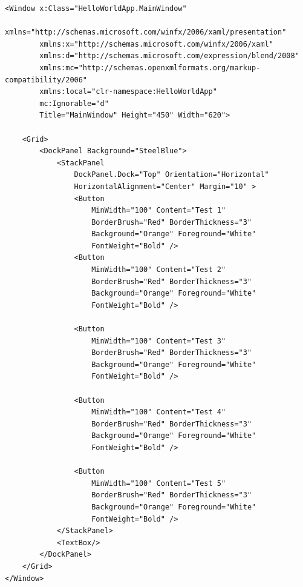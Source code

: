\newpage
\begin{verbatim}
<Window x:Class="HelloWorldApp.MainWindow"
        xmlns="http://schemas.microsoft.com/winfx/2006/xaml/presentation"
        xmlns:x="http://schemas.microsoft.com/winfx/2006/xaml"
        xmlns:d="http://schemas.microsoft.com/expression/blend/2008"
        xmlns:mc="http://schemas.openxmlformats.org/markup-compatibility/2006"
        xmlns:local="clr-namespace:HelloWorldApp"
        mc:Ignorable="d"
        Title="MainWindow" Height="450" Width="620">

    <Grid>
        <DockPanel Background="SteelBlue">
            <StackPanel 
                DockPanel.Dock="Top" Orientation="Horizontal" 
                HorizontalAlignment="Center" Margin="10" >
                <Button
                    MinWidth="100" Content="Test 1" 
                    BorderBrush="Red" BorderThickness="3"
                    Background="Orange" Foreground="White"
                    FontWeight="Bold" />
                <Button
                    MinWidth="100" Content="Test 2" 
                    BorderBrush="Red" BorderThickness="3"
                    Background="Orange" Foreground="White"
                    FontWeight="Bold" />
                    
                <Button 
                    MinWidth="100" Content="Test 3" 
                    BorderBrush="Red" BorderThickness="3"
                    Background="Orange" Foreground="White" 
                    FontWeight="Bold" />
                    
                <Button 
                    MinWidth="100" Content="Test 4" 
                    BorderBrush="Red" BorderThickness="3"
                    Background="Orange" Foreground="White"
                    FontWeight="Bold" />
                
                <Button 
                    MinWidth="100" Content="Test 5" 
                    BorderBrush="Red" BorderThickness="3"
                    Background="Orange" Foreground="White"
                    FontWeight="Bold" />
            </StackPanel>
            <TextBox/>
        </DockPanel>
    </Grid>
</Window>
\end{verbatim}

